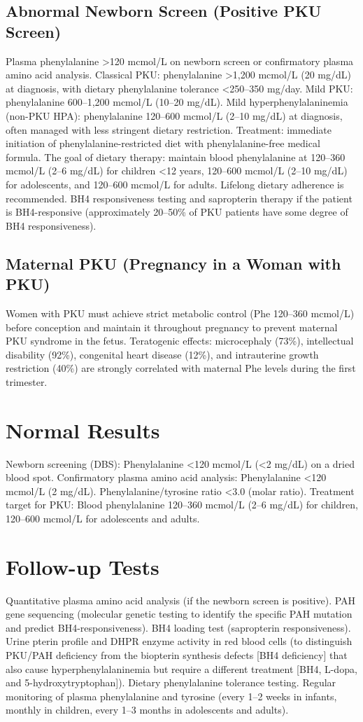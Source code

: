 \subsection*{Abnormal Newborn Screen (Positive PKU Screen)}
Plasma phenylalanine >120 mcmol/L on newborn screen or confirmatory plasma amino acid analysis. Classical PKU: phenylalanine >1,200 mcmol/L (20 mg/dL) at diagnosis, with dietary phenylalanine tolerance <250--350 mg/day. Mild PKU: phenylalanine 600--1,200 mcmol/L (10--20 mg/dL). Mild hyperphenylalaninemia (non-PKU HPA): phenylalanine 120--600 mcmol/L (2--10 mg/dL) at diagnosis, often managed with less stringent dietary restriction. Treatment: immediate initiation of phenylalanine-restricted diet with phenylalanine-free medical formula. The goal of dietary therapy: maintain blood phenylalanine at 120--360 mcmol/L (2--6 mg/dL) for children <12 years, 120--600 mcmol/L (2--10 mg/dL) for adolescents, and 120--600 mcmol/L for adults. Lifelong dietary adherence is recommended. BH4 responsiveness testing and sapropterin therapy if the patient is BH4-responsive (approximately 20--50\% of PKU patients have some degree of BH4 responsiveness).

\subsection*{Maternal PKU (Pregnancy in a Woman with PKU)}
Women with PKU must achieve strict metabolic control (Phe 120--360 mcmol/L) before conception and maintain it throughout pregnancy to prevent maternal PKU syndrome in the fetus. Teratogenic effects: microcephaly (73\%), intellectual disability (92\%), congenital heart disease (12\%), and intrauterine growth restriction (40\%) are strongly correlated with maternal Phe levels during the first trimester.

\section*{Normal Results}
Newborn screening (DBS): Phenylalanine <120 mcmol/L (<2 mg/dL) on a dried blood spot. Confirmatory plasma amino acid analysis: Phenylalanine <120 mcmol/L (2 mg/dL). Phenylalanine/tyrosine ratio <3.0 (molar ratio). Treatment target for PKU: Blood phenylalanine 120--360 mcmol/L (2--6 mg/dL) for children, 120--600 mcmol/L for adolescents and adults.

\section*{Follow-up Tests}
Quantitative plasma amino acid analysis (if the newborn screen is positive). PAH gene sequencing (molecular genetic testing to identify the specific PAH mutation and predict BH4-responsiveness). BH4 loading test (sapropterin responsiveness). Urine pterin profile and DHPR enzyme activity in red blood cells (to distinguish PKU/PAH deficiency from the biopterin synthesis defects [BH4 deficiency] that also cause hyperphenylalaninemia but require a different treatment [BH4, L-dopa, and 5-hydroxytryptophan]). Dietary phenylalanine tolerance testing. Regular monitoring of plasma phenylalanine and tyrosine (every 1--2 weeks in infants, monthly in children, every 1--3 months in adolescents and adults).

